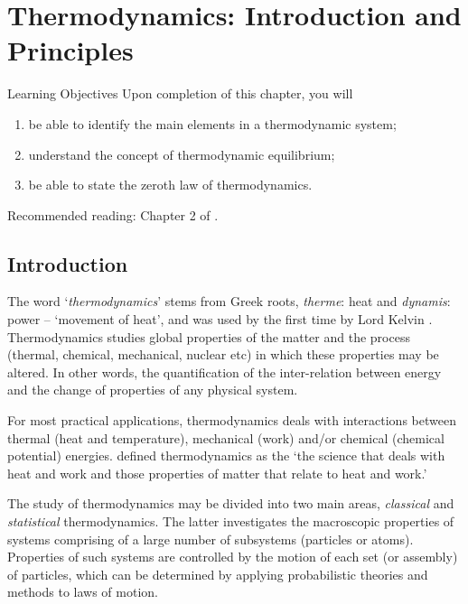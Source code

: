 
\chapter{Thermodynamics: Introduction and Principles}\label{Chapter:Introduction}


   \begin{LearningObjectivesBlock}{Learning Objectives}
      Upon completion of this chapter, you will
        \begin{enumerate}
           \item be able to identify the main elements in a thermodynamic system;
           \item understand the concept of thermodynamic equilibrium;
           \item be able to state the zeroth law of thermodynamics.
        \end{enumerate}
\medskip
     Recommended reading: Chapter 2 of \citet{Atkins_Book,Devoe_Book,Borgnakke_Book}.
   \end{LearningObjectivesBlock}

\localtableofcontents

   \section{Introduction}\label{Chapter:Introduction:Section:Introduction}

   The word `{\it thermodynamics}' stems from Greek roots, {\it therme}: heat and {\it dynamis}: power -- `movement of heat', and was used by the first time by Lord Kelvin \citep{Thomson_1849}. Thermodynamics studies global properties of the matter and the process (\eg thermal, chemical, mechanical, nuclear etc) in which these properties may be altered. In other words, the quantification of the inter-relation between energy and the change of properties of any physical system.

   For most practical applications, thermodynamics deals with interactions between thermal (\ie heat and temperature), mechanical (\ie work) and/or chemical (\ie chemical potential) energies. \citet{Borgnakke_Book} defined thermodynamics as the `the science that deals with heat and work and those properties of matter that relate to heat and work.'

   \medskip
   
   The study of thermodynamics may be divided into two main areas, {\it classical} and {\it statistical} thermodynamics. The latter investigates the macroscopic properties of systems comprising of a large number of subsystems (\ie particles or atoms). Properties of such systems are controlled by the motion of each set (or assembly) of particles, which can be determined by applying probabilistic theories and methods to laws of motion.

